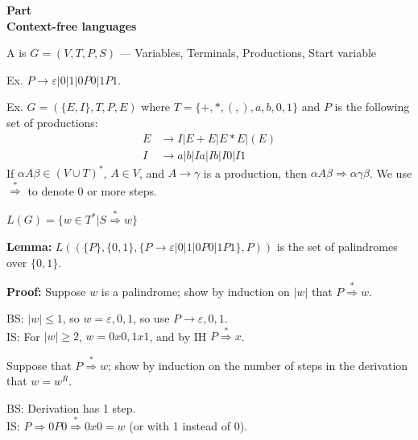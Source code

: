 
\newcommand{\mytitle}{Computational Foundations \\ Section 9.4}
\newcommand{\mychpnr}{9}


\begin{frame}
\begin{center}
\addtocounter{part}{1}
{\bf Part  \\ Context-free languages}
\end{center}
\end{frame}

\begin{frame}
A  is $G=(V,T,P,S)$
--- Variables, Terminals, Productions, Start variable

Ex. $P\longrightarrow\varepsilon|0|1|0P0|1P1$.

Ex. $G=(\{E,I\},T,P,E)$ where $T=\{+,*,(,),a,b,0,1\}$ and $P$ is the
following set of productions:
\begin{align*}
E & \longrightarrow I|E+E|E*E|(E) \\
I & \longrightarrow a|b|Ia|Ib|I0|I1
\end{align*}
If $\alpha A\beta\in(V\cup T)^*$, $A\in V$, and
$A\longrightarrow\gamma$ is a production, then $\alpha
A\beta\Rightarrow\alpha\gamma\beta$.  We use
$\stackrel{*}{\Rightarrow}$ to denote 0 or more steps.

$L(G)=\{w\in T^*|S\stackrel{*}{\Rightarrow}w\}$
\end{frame}

\begin{frame}

{\bf Lemma:}
$L((\{P\},\{0,1\},\{P\longrightarrow\varepsilon|0|1|0P0|1P1\},P))$ is
the set of palindromes over $\{0,1\}$.

{\bf Proof:} Suppose $w$ is a palindrome; show by induction on $|w|$
that $P\stackrel{*}{\Rightarrow}w$.

BS: $|w|\le 1$, so $w=\varepsilon,0,1$, so use
$P\longrightarrow\varepsilon,0,1$.  \\
IS: For $|w|\ge 2$, $w=0x0,1x1$, and
by IH $P\stackrel{*}{\Rightarrow}x$.

Suppose that $P\stackrel{*}{\Rightarrow}w$; show by induction on the
number of steps in the derivation that $w=w^R$.

BS: Derivation has 1 step. \\ 
IS: $P\Rightarrow 0P0\stackrel{*}{\Rightarrow}0x0=w$ (or with 1 instead of 0).
\end{frame}


